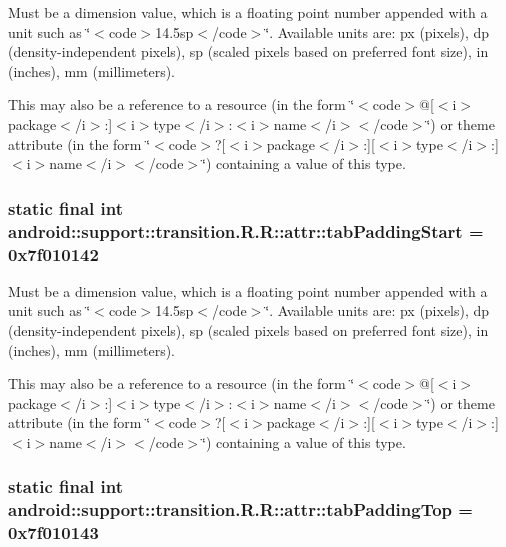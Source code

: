 Must be a dimension value, which is a floating point number appended with a unit such as \char`\"{}$<$code$>$14.5sp$<$/code$>$\char`\"{}. Available units are: px (pixels), dp (density-independent pixels), sp (scaled pixels based on preferred font size), in (inches), mm (millimeters). 

This may also be a reference to a resource (in the form \char`\"{}$<$code$>$@\mbox{[}$<$i$>$package$<$/i$>$:\mbox{]}$<$i$>$type$<$/i$>$:$<$i$>$name$<$/i$>$$<$/code$>$\char`\"{}) or theme attribute (in the form \char`\"{}$<$code$>$?\mbox{[}$<$i$>$package$<$/i$>$:\mbox{]}\mbox{[}$<$i$>$type$<$/i$>$:\mbox{]}$<$i$>$name$<$/i$>$$<$/code$>$\char`\"{}) containing a value of this type. \hypertarget{classandroid_1_1support_1_1transition_1_1_r_1_1attr_eaa3ae71fbf8aab09c274097ca138e2f}{
\subsubsection[{tabPaddingStart}]{\setlength{\rightskip}{0pt plus 5cm}static final int android::support::transition.R.R::attr::tabPaddingStart = 0x7f010142}}
\label{classandroid_1_1support_1_1transition_1_1_r_1_1attr_eaa3ae71fbf8aab09c274097ca138e2f}


Must be a dimension value, which is a floating point number appended with a unit such as \char`\"{}$<$code$>$14.5sp$<$/code$>$\char`\"{}. Available units are: px (pixels), dp (density-independent pixels), sp (scaled pixels based on preferred font size), in (inches), mm (millimeters). 

This may also be a reference to a resource (in the form \char`\"{}$<$code$>$@\mbox{[}$<$i$>$package$<$/i$>$:\mbox{]}$<$i$>$type$<$/i$>$:$<$i$>$name$<$/i$>$$<$/code$>$\char`\"{}) or theme attribute (in the form \char`\"{}$<$code$>$?\mbox{[}$<$i$>$package$<$/i$>$:\mbox{]}\mbox{[}$<$i$>$type$<$/i$>$:\mbox{]}$<$i$>$name$<$/i$>$$<$/code$>$\char`\"{}) containing a value of this type. \hypertarget{classandroid_1_1support_1_1transition_1_1_r_1_1attr_ca027ce8c699bb90de288a74c518be77}{
\subsubsection[{tabPaddingTop}]{\setlength{\rightskip}{0pt plus 5cm}static final int android::support::transition.R.R::attr::tabPaddingTop = 0x7f010143}}
\label{classandroid_1_1support_1_1transition_1_1_r_1_1attr_ca027ce8c699bb90de288a74c518be77}


